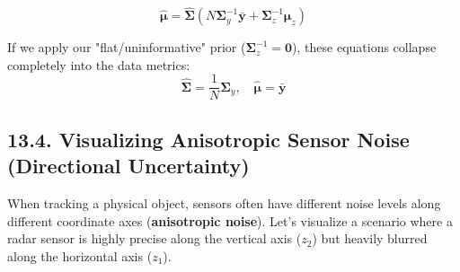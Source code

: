 \documentclass{article}
\begin{document}
\begin{equation}
\hat{\boldsymbol{\mu}} = \hat{\boldsymbol{\Sigma}} \left( N\boldsymbol{\Sigma}_y^{-1}\bar{\mathbf{y}} + \boldsymbol{\Sigma}_z^{-1}\boldsymbol{\mu}_z \right) \tag{64}
\end{equation}

If we apply our "flat/uninformative" prior ($\boldsymbol{\Sigma}_z^{-1} = \mathbf{0}$), these equations collapse completely into the data metrics:
\begin{equation*}
\hat{\boldsymbol{\Sigma}} = \frac{1}{N}\boldsymbol{\Sigma}_y, \quad \hat{\boldsymbol{\mu}} = \bar{\mathbf{y}}
\end{equation*}

\subsection*{13.4. Visualizing Anisotropic Sensor Noise (Directional Uncertainty)}
When tracking a physical object, sensors often have different noise levels along different coordinate axes (\textbf{anisotropic noise}). Let's visualize a scenario where a radar sensor is highly precise along the vertical axis ($z_2$) but heavily blurred along the horizontal axis ($z_1$).
\end{document}
